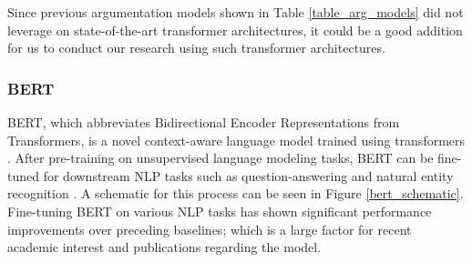 Since previous argumentation models shown in Table \ref{table_arg_models} did not leverage on state-of-the-art transformer architectures, it could be a good addition for us to conduct our research using such transformer architectures.

\subsubsection{BERT}
\label{bert}

BERT, which abbreviates Bidirectional Encoder Representations from Transformers, is a novel context-aware language model trained using transformers \citep{devlin2018bert}. After pre-training on unsupervised language modeling tasks, BERT can be fine-tuned for downstream NLP tasks such as question-answering and natural entity recognition \citep{devlin2018bert}. A schematic for this process can be seen in Figure \ref{bert_schematic}. Fine-tuning BERT on various NLP tasks has shown significant performance improvements over preceding baselines; which is a large factor for recent academic interest and publications regarding the model.


